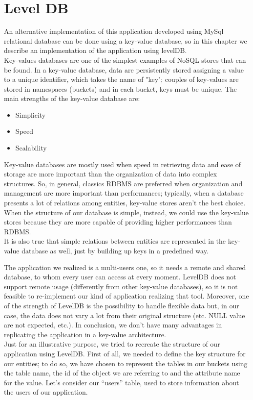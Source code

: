 \documentclass[a4paper, oneside]{article}
\begin{document}
\clearpage


\section{Level DB}

An alternative implementation of this application developed using MySql relational database can be done using a key-value database, so in this chapter we describe an implementation of the application using levelDB.\\
Key-values databases are one of the simplest examples of NoSQL stores that can be found. In a key-value database, data are persistently stored assigning a value to a unique identifier, which takes the name of "key"; couples of key-values are stored in namespaces (buckets) and in each bucket, keys must be unique. The main strengths of the key-value database are:
\begin{itemize}
\item Simplicity
\item Speed 
\item Scalability
\end{itemize}
Key-value databases are mostly used when speed in retrieving data and ease of storage are more important than the organization of data into complex structures. So, in general, classics RDBMS are preferred when organization and management are more important than performances; typically, when a database presents a lot of relations among entities, key-value stores aren’t the best choice. When the structure of our database is simple, instead, we could use the key-value stores because they are more capable of providing higher performances than RDBMS.\\
It is also true that simple relations between entities are represented in the key-value database as well, just by building up keys in a predefined way.

The application we realized is a multi-users one, so it needs a remote and shared database, to whom every user can access at every moment. LevelDB does not support remote usage (differently from other key-value databases), so it is not feasible to re-implement our kind of application realizing that tool. Moreover, one of the strength of LevelDB is the possibility to handle flexible data but, in our case, the data does not vary a lot from their original structure (etc. NULL value are not expected, etc.). In conclusion, we don’t have many advantages in replicating the application in a key-value architecture.\\
Just for an illustrative purpose, we tried to recreate the structure of our application using LevelDB.
First of all, we needed to define the key structure for our entities; to do so, we have chosen to represent the tables in our buckets using the table name, the id of the object we are referring to and the attribute name for the value.
Let’s consider our “users” table, used to store information about the users of our application.\\
\end{document}
